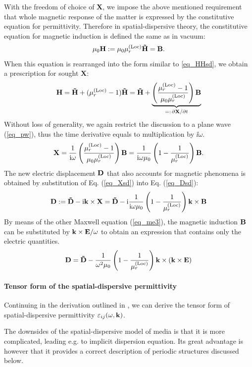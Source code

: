 With the freedom of choice of $\mathbf{X}$, we impose the above mentioned requirement that whole magnetic response of the matter is expressed by the constitutive equation for permittivity. Therefore in spatial-dispersive theory, the constitutive equation %
for magnetic induction is defined the same as in vacuum:
\begin{equation} \mu_0 \mathbf{H} := \mu_0 \mu^{\rm(Loc)}_r \mathbf{\tilde{H}} = \mathbf{B}. \label{eq_mu_sd}\end{equation}
When this equation is rearranged into the form similar to \ref{eq_HHsd}, we obtain a prescription for sought $\mathbf{X}$: 
$$ \mathbf{H} = \mathbf{\tilde{H}} + (\mu^{\rm(Loc)}_r -1)\mathbf{\tilde{H}} = \mathbf{\tilde{H}} + \underbrace{\left(\frac{\mu^{\rm(Loc)}_r-1}{\mu_0\mu^{\rm(Loc)}_r}\right)\mathbf{B}}_{=:\,\partial\mathbf{X}/\partial t}$$
Without loss of generality, we again restrict the discussion to a plane wave (\ref{eq_pw}), thus the time derivative equals to multiplication by $\ii\omega$.
\begin{equation} \mathbf{X} = \frac{1}{{\mathrm i}\omega}\left(\frac{\mu^{\rm(Loc)}_r-1}{\mu_0\mu^{\rm(Loc)}_r}\right)\mathbf{B} = \frac{1}{{\mathrm i}\omega\mu_0}\left(1 - \frac{1}{\mu^{\rm(Loc)}_r}\right)\mathbf{B}. \label{eq_Xsd}\end{equation}
The new electric displacement $\mathbf{D}$ that also accounts for magnetic phenomena is obtained by substitution of Eq. (\ref{eq_Xsd}) into Eq. (\ref{eq_Dsd}):
\begin{equation} \mathbf{D} := \mathbf{\tilde{D}} - {\mathrm i}{\mathbf{k}}\times \mathbf{X} =  \mathbf{\tilde{D}} - {\mathrm i}  \frac{1}{{\mathrm i}\omega\mu_0}\left(1 - \frac{1}{\mu^{\rm(Loc)}_r}\right) {\mathbf{k}}\times \mathbf{B}  \label{eq_Dsd2}\end{equation}
By means of the other Maxwell equation (\ref{eq_me3}), the magnetic induction $\mathbf{B}$ can be substituted by ${\mathbf{k}}\times\mathbf{E} / \omega$ to obtain an expression that contains only the electric quantities.
\begin{equation} \mathbf{D} = \mathbf{\tilde{D}} - \frac{1}{\omega^2 \mu_0}\left(1 - \frac{1}{\mu^{\rm(Loc)}_r}\right) {\mathbf{k}}\times({\mathbf{k}}\times \mathbf{E})  \label{eq_Dsd3}\end{equation}
\paragraph{Tensor form of the spatial-dispersive permittivity}%
Continuing in the derivation outlined in \cite{landau1984electrodynamics, krowne2007book_agran, agranovich2006spatial}, we can derive the tensor form of spatial-dispersive permittivity $\varepsilon_{ij}(\omega,{\mathbf{k}})$.

The downsides of the spatial-dispersive model of media is that it is more complicated, leading e.g. to implicit dispersion equation. Its great advantage is however that it provides a correct description of periodic structures discussed below. 
